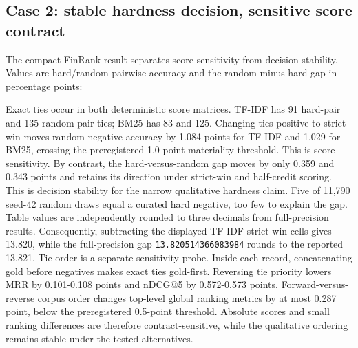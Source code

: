 \documentclass[a4paper,twoside]{article}
\begin{document}
\subsection{Case 2: stable hardness decision, sensitive score contract}
The compact FinRank result separates score sensitivity from decision stability. Values are hard/random pairwise accuracy and the random-minus-hard gap in percentage points:
\begin{table}[htbp]
\centering
\caption{FinRank score sensitivity and narrow decision stability.}
\small
\hfuzz=3pt
\setlength{\tabcolsep}{0.5pt}
\end{table}
Exact ties occur in both deterministic score matrices. TF-IDF has 91 hard-pair and 135 random-pair ties; BM25 has 83 and 125. Changing ties-positive to strict-win moves random-negative accuracy by 1.084 points for TF-IDF and 1.029 for BM25, crossing the preregistered 1.0-point materiality threshold. This is score sensitivity. By contrast, the hard-versus-random gap moves by only 0.359 and 0.343 points and retains its direction under strict-win and half-credit scoring. This is decision stability for the narrow qualitative hardness claim. Five of 11,790 seed-42 random draws equal a curated hard negative, too few to explain the gap.
Table values are independently rounded to three decimals from full-precision results. Consequently, subtracting the displayed TF-IDF strict-win cells gives 13.820, while the full-precision gap \texttt{13.820514366083984} rounds to the reported 13.821.
Tie order is a separate sensitivity probe. Inside each record, concatenating gold before negatives makes exact ties gold-first. Reversing tie priority lowers MRR by 0.101-0.108 points and nDCG@5 by 0.572-0.573 points. Forward-versus-reverse corpus order changes top-level global ranking metrics by at most 0.287 point, below the preregistered 0.5-point threshold. Absolute scores and small ranking differences are therefore contract-sensitive, while the qualitative ordering remains stable under the tested alternatives.
\end{document}
